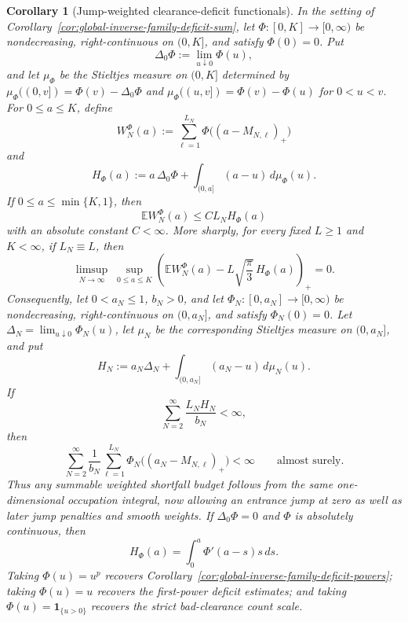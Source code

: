 \documentclass[11pt]{amsart}
\numberwithin{equation}{section}
\newtheorem{corollary}[theorem]{Corollary}
\theoremstyle{definition}
\theoremstyle{remark}
\newcommand{\Exp}{\mathbb E}
\begin{document}
\begin{corollary}[Jump-weighted clearance-deficit functionals]
\label{cor:global-inverse-family-deficit-weighted}
In the setting of Corollary~\ref{cor:global-inverse-family-deficit-sum}, let
\(\Phi:[0,K]\to[0,\infty)\) be nondecreasing, right-continuous on \((0,K]\), and
satisfy \(\Phi(0)=0\).  Put
\[
  \Delta_0\Phi:=\lim_{u\downarrow0}\Phi(u),
\]
and let \(\mu_\Phi\) be the Stieltjes measure on \((0,K]\) determined by
\(\mu_\Phi((0,v])=\Phi(v)-\Delta_0\Phi\) and
\(\mu_\Phi((u,v])=\Phi(v)-\Phi(u)\) for \(0<u<v\).  For \(0\le a\le K\), define
\[
  W_N^\Phi(a):=
  \sum_{\ell=1}^{L_N}\Phi\bigl((a-M_{N,\ell})_+\bigr)
\]
and
\[
  H_\Phi(a):=
  a\,\Delta_0\Phi+\int_{(0,a]} (a-u)\,d\mu_\Phi(u).
\]
If \(0\le a\le\min\{K,1\}\), then
\[
  \Exp W_N^\Phi(a)\le C L_N H_\Phi(a)
\]
with an absolute constant \(C<\infty\).  More sharply, for every fixed
\(L\ge1\) and \(K<\infty\), if \(L_N\equiv L\), then
\[
  \limsup_{N\to\infty}\;
  \sup_{0\le a\le K}
  \left(
    \Exp W_N^\Phi(a)
    -L\sqrt{\frac{\pi}{3}}\,H_\Phi(a)
  \right)_+
  =0 .
\]
Consequently, let \(0<a_N\le1\), \(b_N>0\), and let
\(\Phi_N:[0,a_N]\to[0,\infty)\) be nondecreasing, right-continuous on
\((0,a_N]\), and satisfy \(\Phi_N(0)=0\).  Let
\(\Delta_N=\lim_{u\downarrow0}\Phi_N(u)\), let \(\mu_N\) be the corresponding
Stieltjes measure on \((0,a_N]\), and put
\[
  H_N:=a_N\Delta_N+\int_{(0,a_N]}(a_N-u)\,d\mu_N(u).
\]
If
\[
  \sum_{N=2}^\infty
  \frac{L_NH_N}{b_N}
  <\infty ,
\]
then
\[
  \sum_{N=2}^\infty
  \frac{1}{b_N}
  \sum_{\ell=1}^{L_N}
  \Phi_N\bigl((a_N-M_{N,\ell})_+\bigr)
  <\infty
  \qquad\text{almost surely}.
\]
Thus any summable weighted shortfall budget follows from the same one-dimensional
occupation integral, now allowing an entrance jump at zero as well as later
jump penalties and smooth weights.  If \(\Delta_0\Phi=0\) and \(\Phi\) is
absolutely continuous, then
\[
  H_\Phi(a)=\int_0^a\Phi'(a-s)s\,ds .
\]
Taking \(\Phi(u)=u^p\) recovers
Corollary~\ref{cor:global-inverse-family-deficit-powers}; taking \(\Phi(u)=u\)
recovers the first-power deficit estimates; and taking
\(\Phi(u)=\mathbf1_{\{u>0\}}\) recovers the strict bad-clearance count scale.
\end{corollary}
\end{document}
